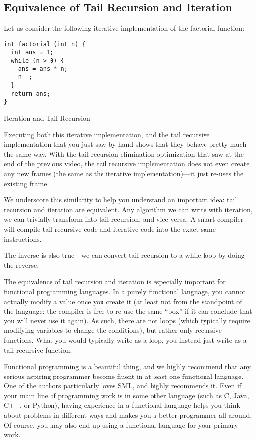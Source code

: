 \documentclass[11pt, a4paper]{article}
\begin{document}
\subsection{Equivalence of Tail Recursion and Iteration}%
\label{sub:equivalence_of_tail_recursion_and_iteration}


Let us consider the following iterative implementation of the factorial function:

\begin{listing}
\begin{verbatim}
int factorial (int n) {
  int ans = 1;
  while (n > 0) {
    ans = ans * n;
    n--;
  }
  return ans;
}
\end{verbatim}
\caption{Iteration and Tail Recursion}
\label{lst:iteration_and_tail_recursion}
\end{listing}



Executing both this iterative implementation, and the tail recursive implementation that you just saw by hand shows that they behave pretty much the same way. With the tail recursion elimination optimization that saw at the end of the previous video, the tail recursive implementation does not even create any new frames (the same as the iterative implementation)---it just re-uses the existing frame.

We underscore this similarity to help you understand an important idea: tail recursion and iteration are equivalent. Any algorithm we can write with iteration, we can trivially transform into tail recursion, and vice-versa. A smart compiler will compile tail recursive code and iterative code into the exact same instructions.

The inverse is also true—we can convert tail recursion to a while loop by doing the reverse.

The equivalence of tail recursion and iteration is especially important for functional programming languages. In a purely functional language, you cannot actually modify a value once you create it (at least not from the standpoint of the language: the compiler is free to re-use the same “box” if it can conclude that you will never use it again). As such, there are not loops (which typically require modifying variables to change the conditions), but rather only recursive functions. What you would typically write as a loop, you instead just write as a tail recursive function.

Functional programming is a beautiful thing, and we highly recommend that any serious aspiring programmer become fluent in at least one functional language. One of the authors particularly loves SML, and highly recommends it. Even if your main line of programming work is in some other language (such as C, Java, C++, or Python), having experience in a functional language helps you think about problems in different ways and makes you a better programmer all around. Of course, you may also end up using a functional language for your primary work.
\end{document}
